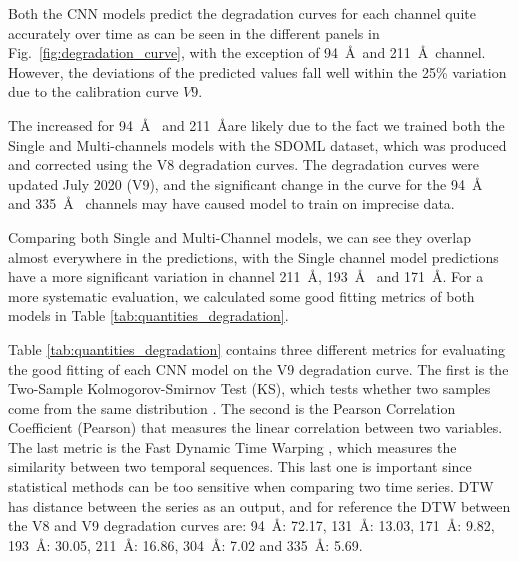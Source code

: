 \documentclass[twocolumn,usenames,dvipsnames]{aastex63}
\begin{document}
Both the CNN models predict the degradation curves for each channel quite accurately over time as can be seen in the different panels in Fig.~\ref{fig:degradation_curve}, with the exception of 94~\AA\ and 211~\AA\ channel. However, the deviations of the predicted values fall well within the 25\% variation due to the calibration curve $V9$. 

The increased  for 94~\AA~ and 211~\AA are likely due to the fact we trained both the Single and Multi-channels models with the SDOML dataset, which was produced and corrected using the V8 degradation curves. The degradation curves were updated July 2020 (V9), and the significant change in the curve for the 94~\AA~ and 335~\AA~ channels may have caused model to train on imprecise data.

Comparing both Single and Multi-Channel models, we can see they overlap almost everywhere in the predictions, with the Single channel model predictions have a more significant variation in channel 211~\AA, 193~\AA~ and 171~\AA. For a more systematic evaluation, we calculated some good fitting metrics of both models in Table \ref{tab:quantities_degradation}.

Table \ref{tab:quantities_degradation} contains three different metrics for evaluating the good fitting of each CNN model on the V9 degradation curve. The first is the Two-Sample Kolmogorov-Smirnov Test (KS), which tests whether two samples come from the same distribution \citep{doi:10.1080/01621459.1951.10500769}. The second is the Pearson Correlation Coefficient (Pearson) that measures the linear correlation between two variables. The last metric is the Fast Dynamic Time Warping \citep[DTW, ][]{fastDTW}, which measures the similarity between two temporal sequences. This last one is important since statistical methods can be too sensitive when comparing two time series. DTW has distance between the series as an output, and for reference the DTW between the V8 and V9 degradation curves are: 94~\AA: 72.17, 131~\AA: 13.03, 171~\AA: 9.82, 193~\AA: 30.05, 211~\AA: 16.86, 304~\AA: 7.02 and 335~\AA: 5.69.
\end{document}
